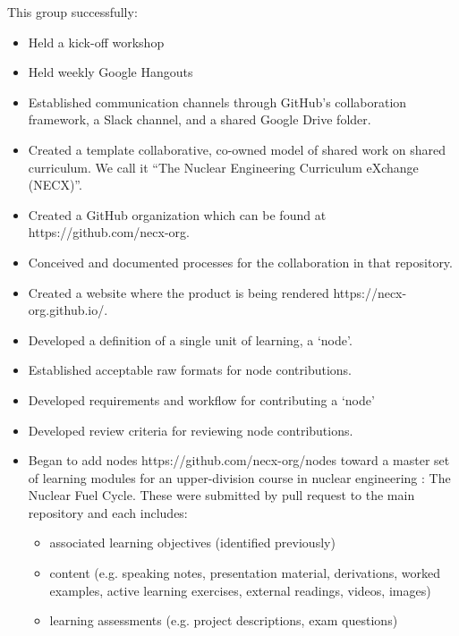 \documentclass[11pt]{article}
\begin{document}
          This group successfully:
          \begin{itemize}
                  \item Held a kick-off workshop 
                  \item Held weekly Google Hangouts
                  \item Established communication channels through GitHub's 
                          collaboration framework, a Slack channel, and a 
                          shared Google Drive folder.
                  \item Created a template 
                          collaborative, co-owned model of shared work on 
                          shared curriculum. We call it ``The Nuclear 
                          Engineering Curriculum eXchange (NECX)''.
                  \item Created a GitHub organization which can be found
                          at https://github.com/necx-org. 
                  \item Conceived and documented processes for the collaboration in that repository.
                  \item Created a website where the product is being rendered https://necx-org.github.io/.
                  \item Developed a definition of a single unit of learning, a 
                          `node'.
                  \item Established acceptable raw formats for node 
                          contributions.
                  \item Developed requirements and workflow for contributing a `node'
                  \item Developed review criteria for reviewing node contributions.
                  \item Began to add nodes https://github.com/necx-org/nodes 
                          toward a master set of learning modules for an 
                          upper-division course in nuclear engineering : The 
                          Nuclear Fuel Cycle. These were submitted by pull 
                          request to the main repository and each includes:
          \begin{itemize} 
                  \item associated learning objectives (identified previously)
                \item content (e.g. speaking notes, presentation material, 
                        derivations, worked examples, active learning  
                          exercises, external readings, videos, images)
                  \item learning assessments (e.g. project descriptions, exam questions) 
          \end{itemize}
          \end{itemize} 
\end{document}
